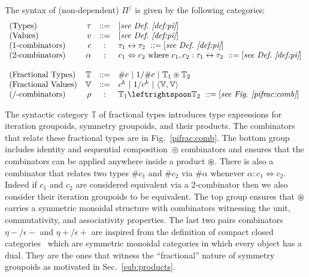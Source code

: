 \documentclass[a4paper,USenglish]{lipics-v2016-utf8x}
\newcommand{\ft}{\mathbb{T}}
\newcommand{\hash}{\#}
\newcommand{\iso}{\leftrightarrow}
\newcommand{\isotwo}{\Leftrightarrow}
\newcommand{\alt}{~|~}
\newcommand{\order}[1]{\hash #1}
\newcommand{\iorder}[1]{1/\hash #1}
\begin{document}
\begin{definition}
\label{def:pifrac}
The syntax of (non-dependent) $\Pi^/$ is given by the following categories:
\[\begin{array}{lrcl}
(\textrm{Types}) & \tau &::=& [\textit{see Def.~\ref{def:pi}}] \\
(\textrm{Values}) & v &::=& [\textit{see Def.~\ref{def:pi}}] \\
(\textrm{1-combinators}) & c &:& \tau_1 \iso \tau_2 ~::= [\textit{see Def.~\ref{def:pi}}] \\
(\textrm{2-combinators}) & \alpha &:& c_1 \isotwo c_2 \mbox{~where~}
  c_1, c_2 : \tau_1 \iso \tau_2 ~::= [\textit{see Def.~\ref{def:pi}}] \\
\\
(\textrm{Fractional Types}) & \mathbb{T} &::=&
  \order{c} \alt \iorder{c} \alt \mathbb{T}_1 \circledast \mathbb{T}_2 \\
 (\textrm{Fractional Values}) & \mathbb{V} &::=&
  c^k \alt 1/c^k \alt \langle \mathbb{V},\mathbb{V} \rangle \\
 (\textrm{/-combinators}) & \rho &:& \mathbb{T}_1 \leftrightspoon \mathbb{T}_2 ~::=
  [\textit{see Fig.~\ref{pifrac:comb}}]
\end{array}\]
\end{definition}

The syntactic category $\ft$ of fractional types introduces type expressions for
iteration groupoids, symmetry groupoids, and their products. The combinators
that relate these fractional types are in Fig.~\ref{pifrac:comb}. The bottom
group includes identity and sequential composition~$\circledcirc$ combinators
and ensures that the combinators can be applied anywhere inside a product
$\circledast$. There is also a combinator that relates two types $\order{c_1}$
and $\order{c_2}$ via $\order{\alpha}$ whenever $\alpha : c_1 \isotwo
c_2$.
Indeed if $c_1$ and $c_2$ are considered equivalent via a 2-combinator then we
also consider their iteration groupoids to be equivalent. The top group ensures
that $\circledast$ carries a symmetric monoidal structure with combinators
witnessing the unit, commutativity, and associativity properties. The last two
pairs combinators $\eta-/\epsilon-$ and $\eta+/\epsilon+$ are inspired from the
definition of compact closed categories~\cite{ccc} which are symmetric monoidal
categories in which every object has a dual. They are the ones that witness the
``fractional'' nature of symmetry groupoids as motivated in Sec.~\ref{sub:products}.
\end{document}
